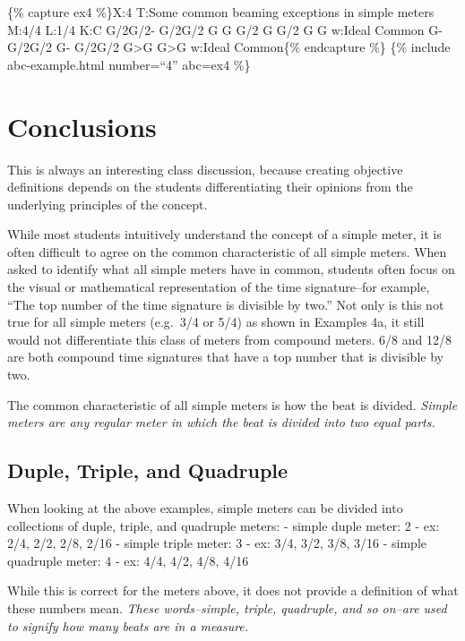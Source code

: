 \documentclass{book}
\begin{document}
\{\% capture ex4 \%\}X:4 T:Some common beaming exceptions in simple meters
M:4/4 L:1/4 K:C G/2G/2- G/2G/2 G G\textbar{} G/2 G G/2 G G\textbar\textbar{}
w:Ideal\textbar{} Common G- G/2G/2 G- G/2G/2\textbar{} G\textgreater G
G\textgreater G\textbar{]} w:Ideal\textbar{} Common\textbar\{\% endcapture
\%\} \{\% include abc-example.html number=``4'' abc=ex4 \%\}

\hypertarget{conclusions-19}{%
\section{Conclusions}\label{conclusions-19}}

This is always an interesting class discussion, because creating objective
definitions depends on the students differentiating their opinions from the
underlying principles of the concept.

While most students intuitively understand the concept of a simple meter, it
is often difficult to agree on the common characteristic of all simple meters.
When asked to identify what all simple meters have in common, students often
focus on the visual or mathematical representation of the time signature--for
example, ``The top number of the time signature is divisible by two.'' Not
only is this not true for all simple meters (e.g.~3/4 or 5/4) as shown in
Examples 4a, it still would not differentiate this class of meters from
compound meters. 6/8 and 12/8 are both compound time signatures that have a
top number that is divisible by two.

The common characteristic of all simple meters is how the beat is divided.
\emph{Simple meters are any regular meter in which the beat is divided into
two equal parts.}

\hypertarget{duple-triple-and-quadruple}{%
\subsection{Duple, Triple, and Quadruple}\label{duple-triple-and-quadruple}}

When looking at the above examples, simple meters can be divided into
collections of duple, triple, and quadruple meters: - simple duple meter: 2 -
ex: 2/4, 2/2, 2/8, 2/16 - simple triple meter: 3 - ex: 3/4, 3/2, 3/8, 3/16 -
simple quadruple meter: 4 - ex: 4/4, 4/2, 4/8, 4/16

While this is correct for the meters above, it does not provide a definition
of what these numbers mean. \emph{These words--simple, triple, quadruple, and
so on--are used to signify how many beats are in a measure.}
\end{document}
